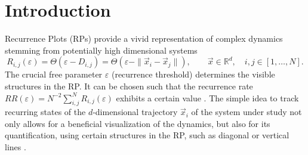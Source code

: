 \documentclass[entropy,article,submit,pdftex,moreauthors]{Definitions/mdpi}
\begin{document}
\section{Introduction}\label{sec_tau_rr_intro}

Recurrence Plots (RPs) provide a vivid representation of complex dynamics stemming from potentially high dimensional systems \cite{marwan2007}
\begin{equation}\label{eq_rp_definition}
R_{i,j}(\varepsilon) = \Theta\left(\varepsilon - D_{i,j}\right) 
= \Theta\left(\varepsilon - \| \vec{x}_i - \vec{x}_j\|\right), \qquad \vec{x} \in \mathbb{R}^d, \quad i,j \in [1,\ldots, N].
\end{equation}
The crucial free parameter $\varepsilon$ (recurrence threshold) determines the visible structures in the RP. It can be chosen such that the recurrence rate 
$RR(\varepsilon)=N^{-2}\sum_{i,j}^N R_{i,j}(\varepsilon)$ exhibits a certain value \cite{kraemer2018}.
The simple idea to track recurring states of the $d$-dimensional trajectory $\vec{x}_i$ of the system under study not only allows for a beneficial visualization of the dynamics, but also for its 
quantification, using certain structures in the RP, such as diagonal or vertical lines \cite{marwan2007}. 
\end{document}
